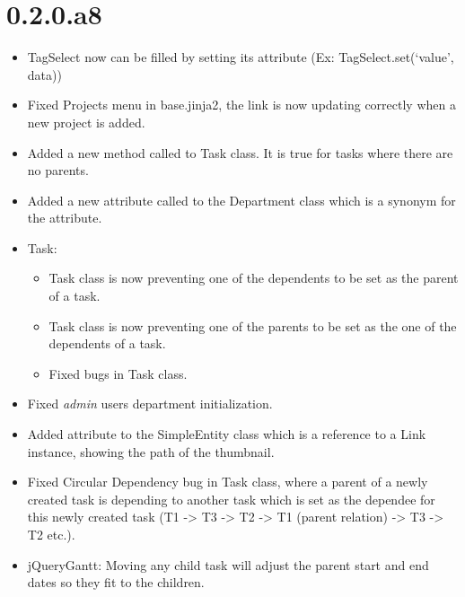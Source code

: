\documentclass[a4paper,10pt,english]{sphinxmanual}
\begin{document}
\section{0.2.0.a8}
\label{changelog:a8}\begin{itemize}
\item {} 
TagSelect now can be filled by setting its  attribute (Ex:
TagSelect.set(`value', data))

\item {} 
Fixed Projects menu in base.jinja2, the link is now updating correctly when a
new project is added.

\item {} 
Added a new method called  to Task class. It is true for tasks
where there are no parents.

\item {} 
Added a new attribute called  to the Department class which is a
synonym for the  attribute.

\item {} 
Task:
\begin{itemize}
\item {} 
Task class is now preventing one of the dependents to be set as the parent
of a task.

\item {} 
Task class is now preventing one of the parents to be set as the one of the
dependents of a task.

\item {} 
Fixed  bugs in Task class.

\end{itemize}

\item {} 
Fixed \emph{admin} users department initialization.

\item {} 
Added  attribute to the SimpleEntity class which is a reference
to a Link instance, showing the path of the thumbnail.

\item {} 
Fixed Circular Dependency bug in Task class, where a parent of a newly
created task is depending to another task which is set as the dependee for
this newly created task (T1 -\textgreater{} T3 -\textgreater{} T2 -\textgreater{} T1 (parent relation) -\textgreater{} T3 -\textgreater{} T2
etc.).

\item {} 
jQueryGantt: Moving any child task will adjust the parent start and end dates
so they fit to the children.

\end{itemize}
\end{document}
